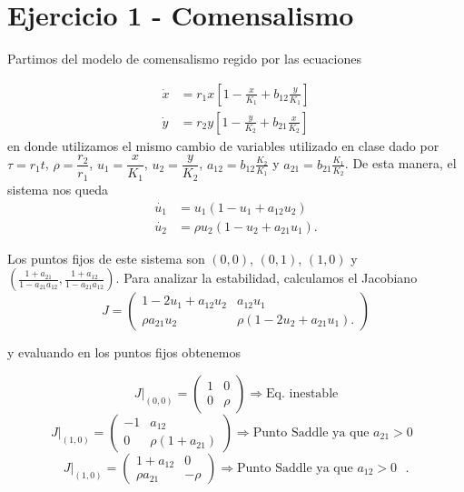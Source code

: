 \section*{Ejercicio 1 - Comensalismo}

Partimos del modelo de comensalismo regido por las ecuaciones

\begin{align}
    \dot{x} &= r_1 x \left[1 - \frac{x}{K_1} + b_{12}\frac{y}{K_1}\right] \\
    \dot{y} &= r_2 y \left[1 - \frac{y}{K_2} + b_{21}\frac{x}{K_2}\right]
\end{align}
en donde utilizamos el mismo cambio de variables utilizado en clase dado por $\tau=r_1 t$, $\rho = \dfrac{r_2}{r_1}$, $u_1 = \dfrac{x}{K_1}$, $u_2 = \dfrac{y}{K_2}$, $a_{12} = b_{12}\frac{K_2}{K_1}$ y $a_{21} = b_{21}\frac{K_1}{K_2}$. De esta manera, el sistema nos queda
\begin{align}
    \dot{u_1} &= u_1 \left(1 - u_1 + a_{12} u_2\right) \\
    \dot{u_2} &= \rho u_2 \left(1 - u_2 + a_{21} u_1\right).
\end{align}

Los puntos fijos de este sistema son $\left(0,0\right)$, $\left(0,1\right)$, $\left(1,0\right)$ y $\left(\frac{1+a_{21}}{1-a_{21}a_{12}},\frac{1+a_{12}}{1-a_{21}a_{12}}\right)$. Para analizar la estabilidad, calculamos el Jacobiano
\begin{equation}
    J =
    \begin{pmatrix}
        1-2u_1 + a_{12}u_2 & a_{12}u_1 \\[6pt]
        \rho a_{21} u_2    & \rho \left( 1-2 u_2 + a_{21} u_1 \right). 
    \end{pmatrix}
\end{equation}

y evaluando en los puntos fijos obtenemos

\begin{equation}
J |_{\left(0,0\right)}=
\begin{pmatrix}
    1   & 0 \\[6pt]
    0   & \rho
\end{pmatrix}
\Rightarrow \text{Eq. inestable} 
\end{equation}
\begin{equation}
J |_{\left(1,0\right)} =
\begin{pmatrix}
    -1  & a_{12} \\[6pt]
    0   & \rho \left( 1 + a_{21} \right)
\end{pmatrix}
\Rightarrow \text{Punto Saddle ya que $a_{21} > 0$ }
\end{equation}
\begin{equation}
    J |_{\left(1,0\right)} =
    \begin{pmatrix}
        1+a_{12}        & 0 \\[6pt]
        \rho a_{21}     & -\rho
    \end{pmatrix}
    \Rightarrow \text{Punto Saddle ya que $a_{12} > 0$ }.
\end{equation}

